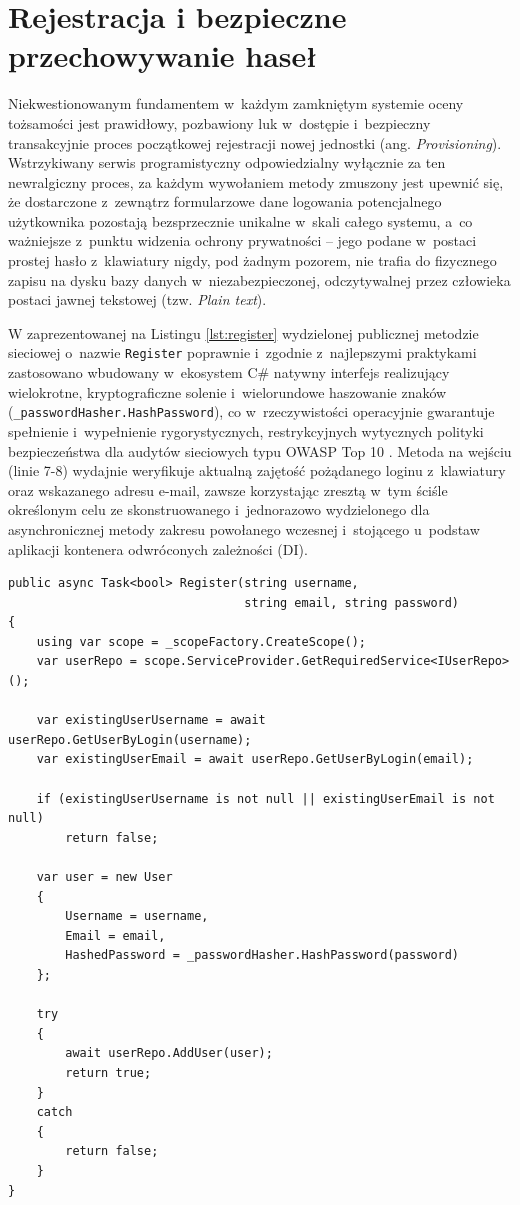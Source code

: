 \documentclass{SGGW-thesis}
\begin{document}
\section{Rejestracja i bezpieczne przechowywanie haseł}

Niekwestionowanym fundamentem w~każdym zamkniętym systemie oceny tożsamości jest prawidłowy, pozbawiony luk w~dostępie i~bezpieczny transakcyjnie proces początkowej rejestracji nowej jednostki (ang. \textit{Provisioning}). Wstrzykiwany serwis programistyczny odpowiedzialny wyłącznie za ten newralgiczny proces, za każdym wywołaniem metody zmuszony jest upewnić się, że dostarczone z~zewnątrz formularzowe dane logowania potencjalnego użytkownika pozostają bezsprzecznie unikalne w~skali całego systemu, a~co ważniejsze z~punktu widzenia ochrony prywatności – jego podane w~postaci prostej hasło z~klawiatury nigdy, pod żadnym pozorem, nie trafia do fizycznego zapisu na dysku bazy danych w~niezabezpieczonej, odczytywalnej przez człowieka postaci jawnej tekstowej (tzw. \textit{Plain text}). 

W zaprezentowanej na Listingu \ref{lst:register} wydzielonej publicznej metodzie sieciowej o~nazwie \texttt{Register} poprawnie i~zgodnie z~najlepszymi praktykami zastosowano wbudowany w~ekosystem C\# natywny interfejs realizujący wielokrotne, kryptograficzne solenie i~wielorundowe haszowanie znaków (\texttt{\_passwordHasher.HashPassword}), co w~rzeczywistości operacyjnie gwarantuje spełnienie i~wypełnienie rygorystycznych, restrykcyjnych wytycznych polityki bezpieczeństwa dla audytów sieciowych typu OWASP Top 10 \cite{owasp2021}. Metoda na wejściu (linie 7-8) wydajnie weryfikuje aktualną zajętość pożądanego loginu z~klawiatury oraz wskazanego adresu e-mail, zawsze korzystając zresztą w~tym ściśle określonym celu ze skonstruowanego i~jednorazowo wydzielonego dla asynchronicznej metody zakresu powołanego wczesnej i~stojącego u~podstaw aplikacji kontenera odwróconych zależności (DI).

\clearpage
\begin{lstlisting}[caption={Metoda rejestracji użytkownika wraz z szyfrowaniem haseł}, label={lst:register}]
public async Task<bool> Register(string username, 
                                 string email, string password)
{
    using var scope = _scopeFactory.CreateScope();
    var userRepo = scope.ServiceProvider.GetRequiredService<IUserRepo>();

    var existingUserUsername = await userRepo.GetUserByLogin(username);
    var existingUserEmail = await userRepo.GetUserByLogin(email);

    if (existingUserUsername is not null || existingUserEmail is not null)
        return false;

    var user = new User
    {
        Username = username,
        Email = email,
        HashedPassword = _passwordHasher.HashPassword(password)
    };

    try
    {
        await userRepo.AddUser(user);
        return true;
    }
    catch
    {
        return false;
    }
}
\end{lstlisting}
\end{document}

